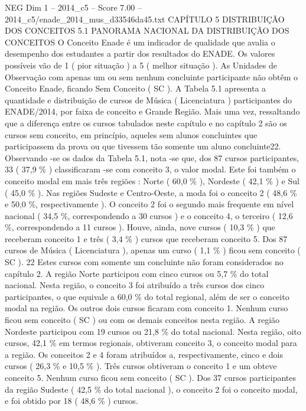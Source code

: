 \begin{textsample}{NEG Dim 1 – 2014\_c5 – Score 7.00 – 2014\_c5/enade\_2014\_mus\_d33546da45.txt}  \label{ex:f1_neg_335}
CAPÍTULO 5 DISTRIBUIÇÃO DOS CONCEITOS 5.1 PANORAMA NACIONAL DA DISTRIBUIÇÃO DOS CONCEITOS O Conceito Enade é um indicador de qualidade que avalia o desempenho dos estudantes a partir dos resultados do ENADE.
Os valores possíveis vão de 1 ( pior situação ) a 5 ( melhor situação ).
As Unidades de Observação com apenas um ou sem nenhum concluinte participante não obtêm o Conceito Enade, ficando Sem Conceito ( SC ).
A Tabela 5.1 apresenta a quantidade e distribuição de cursos de Música ( Licenciatura ) participantes do ENADE/2014, por faixa de conceito e Grande Região.
Mais uma vez, ressaltando que a diferença entre os cursos tabulados neste capítulo e no capítulo 2 são os cursos sem conceito, em princípio, aqueles sem alunos concluintes que participassem da prova ou que tivessem tão somente um aluno concluinte22.
Observando -se os dados da Tabela 5.1, nota -se que, dos 87 cursos participantes, 33 ( 37,9 \% ) classificaram -se com conceito 3, o valor modal.
Este foi também o conceito modal em mais três regiões : Norte ( 60,0 \% ), Nordeste ( 42,1 \% ) e Sul ( 45,0 \% ).
Nas regiões Sudeste e Centro-Oeste, a moda foi o conceito 2 ( 48,6 \% e 50,0 \%, respectivamente ).
O conceito 2 foi o segundo mais frequente em nível nacional ( 34,5 \%, correspondendo a 30 cursos ) e o conceito 4, o terceiro ( 12,6 \%, correspondendo a 11 cursos ).
Houve, ainda, nove cursos ( 10,3 \% ) que receberam conceito 1 e três ( 3,4 \% ) cursos que receberam conceito 5.
Dos 87 cursos de Música ( Licenciatura ), apenas um curso ( 1,1 \% ) ficou sem conceito ( SC ). 22 Estes cursos com somente um concluinte não foram considerados no capítulo 2.
A região Norte participou com cinco cursos ou 5,7 \% do total nacional.
Nesta região, o conceito 3 foi atribuído a três cursos dos cinco participantes, o que equivale a 60,0 \% do total regional, além de ser o conceito modal na região.
Os outros dois cursos ficaram com conceito 1.
Nenhum curso ficou sem conceito ( SC ) ou com os demais conceitos nesta região.
A região Nordeste participou com 19 cursos ou 21,8 \% do total nacional.
Nesta região, oito cursos, 42,1 \% em termos regionais, obtiveram conceito 3, o conceito modal para a região.
Os conceitos 2 e 4 foram atribuídos a, respectivamente, cinco e dois cursos ( 26,3 \% e 10,5 \% ).
Três cursos obtiveram o conceito 1 e um obteve conceito 5.
Nenhum curso ficou sem conceito ( SC ).
Dos 37 cursos participantes da região Sudeste ( 42,5 \% do total nacional ), o conceito 2 foi o conceito modal, e foi obtido por 18 ( 48,6 \% ) cursos.

\end{textsample}
